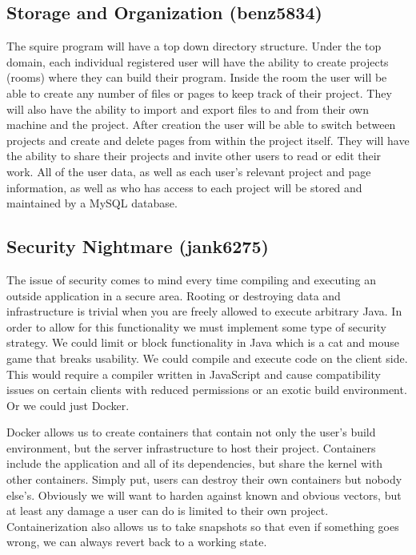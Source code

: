 \documentclass[11pt]{report}
\begin{document}
\begin{IDE-like Features}
\begin{}
\begin{Collaborative features that would be "nice":}
\subsection{Storage and Organization (benz5834)}
The squire program will have a top down directory structure.
Under the top domain, each individual registered user will have the ability to create projects (rooms) where they can build their program. 
Inside the room the user will be able to create any number of files or pages to keep track of their project. 
They will also have the ability to import and export files to and from their own machine and the project. 
After creation the user will be able to switch between projects and create and delete pages from within the project itself.  
They will have the ability to share their projects and invite other users to read or edit their work. 
All of the user data, as well as each user’s relevant project and page information, as well as who has access to each project will be stored and maintained by a MySQL database.

\subsection{Security Nightmare (jank6275)}
The issue of security comes to mind every time compiling and executing an outside application in a secure area. Rooting or destroying data and infrastructure is trivial when you are freely allowed to execute arbitrary Java. In order to allow for this functionality we must implement some type of security strategy. We could limit or block functionality in Java which is a cat and mouse game that breaks usability. We could compile and execute code on the client side. This would require a compiler written in JavaScript and cause compatibility issues on certain clients with reduced permissions or an exotic build environment. Or we could just Docker.


Docker allows us to create containers that contain not only the user's build environment, but the server infrastructure to host their project. Containers include the application and all of its dependencies, but share the kernel with other containers. Simply put, users can destroy their own containers but nobody else’s. Obviously we will want to harden against known and obvious vectors, but at least any damage a user can do is limited to their own project. Containerization also allows us to take snapshots so that even if something goes wrong, we can always revert back to a working state.


\end{Collaborative features that would be "nice":}
\end{}
\end{IDE-like Features}
\end{document}
